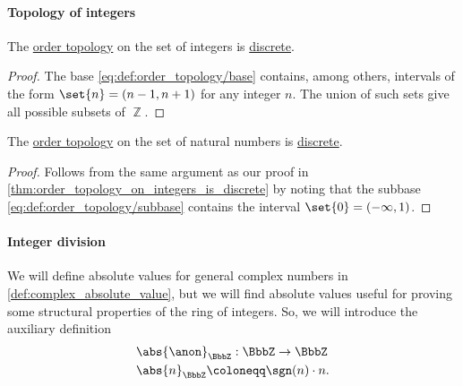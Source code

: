 \paragraph{Topology of integers}

\begin{proposition}\label{thm:order_topology_on_integers_is_discrete}
  The \hyperref[def:order_topology]{order topology} on the set of integers is \hyperref[def:discrete_topology]{discrete}.
\end{proposition}
\begin{proof}
  The base \eqref{eq:def:order_topology/base} contains, among others, intervals of the form \( \set{ n } = (n - 1, n + 1) \) for any integer \( n \). The union of such sets give all possible subsets of \( \BbbZ \).
\end{proof}

\begin{corollary}\label{thm:order_topology_on_natural_numbers_is_discrete}
  The \hyperref[def:order_topology]{order topology} on the set of natural numbers is \hyperref[def:discrete_topology]{discrete}.
\end{corollary}
\begin{proof}
  Follows from the same argument as our proof in \cref{thm:order_topology_on_integers_is_discrete} by noting that the subbase \eqref{eq:def:order_topology/subbase} contains the interval \( \set{ 0 } = (-\infty, 1) \).
\end{proof}

\paragraph{Integer division}

\begin{definition}\label{def:integer_absolute_value}\mimprovised
  We will define absolute values for general complex numbers in \cref{def:complex_absolute_value}, but we will find absolute values useful for proving some structural properties of the ring of integers. So, we will introduce the auxiliary definition
  \begin{equation*}
    \begin{aligned}
      &\abs{\anon}_\BbbZ: \BbbZ \to \BbbZ \\
      &\abs{n}_\BbbZ \coloneqq \sgn(n) \cdot n.
    \end{aligned}
  \end{equation*}
\end{definition}


